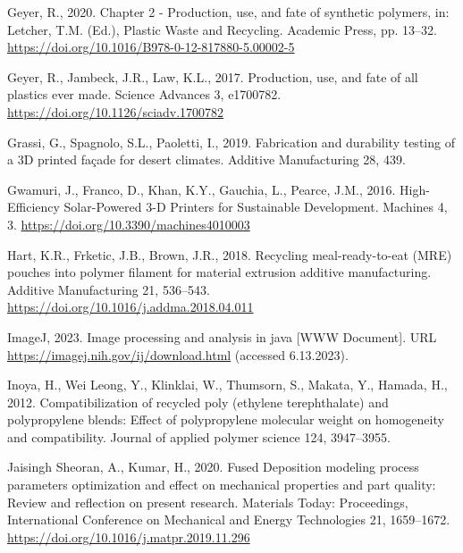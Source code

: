 \documentclass[
  12pt,
]{article}
\newlength{\cslhangindent}
\newlength{\cslentryspacingunit} %
\newenvironment{CSLReferences}[2] %
 {%
  \setlength{\parindent}{0pt}
  \ifodd #1
  \let\oldpar\par
  \def\par{\hangindent=\cslhangindent\oldpar}
  \fi
  \setlength{\parskip}{#2\cslentryspacingunit}
 }%
 {}
\begin{document}
\begin{CSLReferences}{1}{0}
\leavevmode{}%
Geyer, R., 2020. Chapter 2 - {Production}, use, and fate of synthetic
polymers, in: Letcher, T.M. (Ed.), Plastic {Waste} and {Recycling}.
{Academic Press}, pp. 13--32.
\url{https://doi.org/10.1016/B978-0-12-817880-5.00002-5}

\leavevmode{}%
Geyer, R., Jambeck, J.R., Law, K.L., 2017. Production, use, and fate of
all plastics ever made. Science Advances 3, e1700782.
\url{https://doi.org/10.1126/sciadv.1700782}

\leavevmode{}%
Grassi, G., Spagnolo, S.L., Paoletti, I., 2019. Fabrication and
durability testing of a {3D} printed façade for desert climates.
Additive Manufacturing 28, 439.

\leavevmode{}%
Gwamuri, J., Franco, D., Khan, K.Y., Gauchia, L., Pearce, J.M., 2016.
High-{Efficiency Solar-Powered} 3-{D Printers} for {Sustainable
Development}. Machines 4, 3.
\url{https://doi.org/10.3390/machines4010003}

\leavevmode{}%
Hart, K.R., Frketic, J.B., Brown, J.R., 2018. Recycling
meal-ready-to-eat ({MRE}) pouches into polymer filament for material
extrusion additive manufacturing. Additive Manufacturing 21, 536--543.
\url{https://doi.org/10.1016/j.addma.2018.04.011}

\leavevmode{}%
ImageJ, 2023. Image processing and analysis in java {[}WWW Document{]}.
URL \url{https://imagej.nih.gov/ij/download.html} (accessed 6.13.2023).

\leavevmode{}%
Inoya, H., Wei Leong, Y., Klinklai, W., Thumsorn, S., Makata, Y.,
Hamada, H., 2012. Compatibilization of recycled poly (ethylene
terephthalate) and polypropylene blends: Effect of polypropylene
molecular weight on homogeneity and compatibility. Journal of applied
polymer science 124, 3947--3955.

\leavevmode{}%
Jaisingh Sheoran, A., Kumar, H., 2020. Fused {Deposition} modeling
process parameters optimization and effect on mechanical properties and
part quality: {Review} and reflection on present research. Materials
Today: Proceedings, International {Conference} on {Mechanical} and
{Energy Technologies} 21, 1659--1672.
\url{https://doi.org/10.1016/j.matpr.2019.11.296}


\end{CSLReferences}
\end{document}
